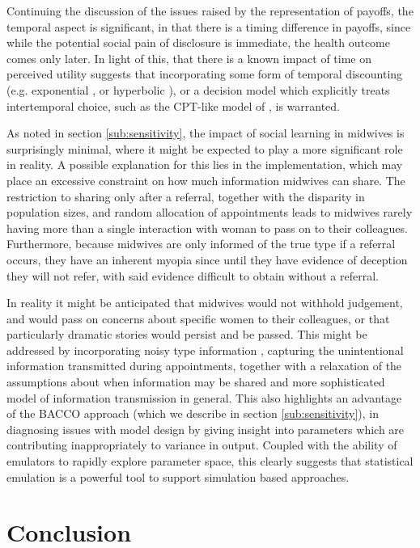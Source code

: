 Continuing the discussion of the issues raised by the representation of payoffs, the temporal aspect is significant, in that there is a timing difference in payoffs, since while the potential social pain of disclosure is immediate, the health outcome comes only later. In light of this, that there is a known impact of time on perceived utility \citet{Thaler1981} suggests that incorporating some form of temporal discounting (e.g. exponential \citep{Samuelson1937}, or hyperbolic \citep{Ainslie1991}), or a decision model which explicitly treats intertemporal choice, such as the \ac{CPT}-like model of \citet{Loewenstein1992}, is warranted. 

As noted in section \ref{sub:sensitivity}, the impact of social learning in midwives is surprisingly minimal, where it might be expected to play a more significant role in reality. A possible explanation for this lies in the implementation, which may place an excessive constraint on how much information midwives can share. The restriction to sharing only after a referral, together with the disparity in population sizes, and random allocation of appointments leads to midwives rarely having more than a single interaction with woman to pass on to their colleagues. Furthermore, because midwives are only informed of the true type if a referral occurs, they have an inherent myopia since until they have evidence of deception they will not refer, with said evidence difficult to obtain without a referral.

In reality it might be anticipated that midwives would not withhold judgement, and would pass on concerns about specific women to their colleagues, or that particularly dramatic stories would persist and be passed. This might be addressed by incorporating noisy type information \citep{Feltovich2002}, capturing the unintentional information transmitted during appointments, together with a relaxation of the assumptions about when information may be shared and more sophisticated model of information transmission in general. This also highlights an advantage of the \ac{BACCO} approach (which we describe in section \ref{sub:sensitivity}), in diagnosing issues with model design by giving insight into parameters which are contributing inappropriately to variance in output. Coupled with the ability of emulators to rapidly explore parameter space, this clearly suggests that statistical emulation is a powerful tool to support simulation based approaches.

\section{Conclusion}
\label{sec:conclusion}

